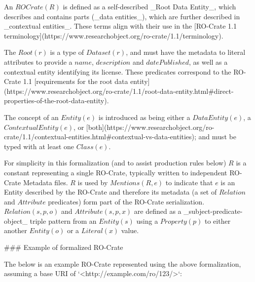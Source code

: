\begin{markdown}
An $ROCrate(R)$ is defined as a self-described _Root Data Entity_, which describes and contains parts (_data entities_), which are further described in _contextual entities_.  These terms align with their use in the [RO-Crate 1.1 terminology](https://www.researchobject.org/ro-crate/1.1/terminology). 

The $Root(r)$ is a type of $Dataset(r)$, and must have the metadata to literal attributes to provide a $name$, $description$ and $datePublished$, as well as a contextual entity identifying its license. These predicates correspond to the RO-Crate 1.1 [requirements for the root data entity](https://www.researchobject.org/ro-crate/1.1/root-data-entity.html#direct-properties-of-the-root-data-entity).

The concept of an $Entity(e)$ is introduced as being either a $DataEntity(e)$, a $ContextualEntity(e)$, or [both](https://www.researchobject.org/ro-crate/1.1/contextual-entities.html#contextual-vs-data-entities); and must be typed with at least one $Class(e)$. 

For simplicity in this formalization (and to assist production rules below) $R$ is a constant representing a single RO-Crate, typically written to independent RO-Crate Metadata files. $R$ is used by $Mentions(R, e)$ to indicate that $e$ is an Entity described by the RO-Crate and therefore its metadata (a set of $Relation$ and $Attribute$ predicates) form part of the RO-Crate serialization. $Relation(s, p, o)$ and $Attribute(s, p, x)$ are defined as a _subject-predicate-object_ triple pattern from an $Entity(s)$ using a $Property(p)$ to either another $Entity(o)$ or a $Literal(x)$ value.
\end{markdown}

\begin{markdown}
### Example of formalized RO-Crate 

The below is an example RO-Crate represented using the above formalization, assuming a base URI of `<http://example.com/ro/123/>`:
\end{markdown}

